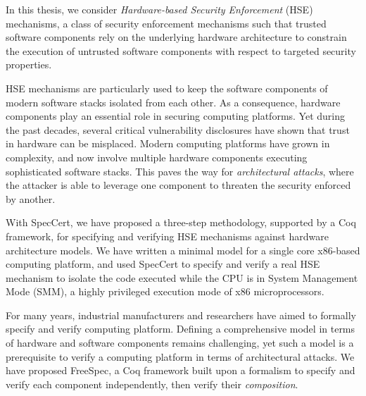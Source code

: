 In this thesis, we consider \emph{Hardware-based Security Enforcement} (HSE)
mechanisms, a class of security enforcement mechanisms such that trusted
software components rely on the underlying hardware architecture to constrain
the execution of untrusted software components with respect to targeted
security properties.

HSE mechanisms are particularly used to keep the software components of modern
software stacks isolated from each other.
%
As a consequence, hardware components play an essential role in securing
computing platforms.
%
Yet during the past decades, several critical vulnerability disclosures have
shown that trust in hardware can be misplaced.
%
Modern computing platforms have grown in complexity, and now involve multiple
hardware components executing sophisticated software stacks.
%
This paves the way for \emph{architectural attacks}, where the attacker is
able to leverage one component to threaten the security enforced by another.

With SpecCert, we have proposed a three-step methodology, supported by a Coq
framework, for specifying and verifying HSE mechanisms against hardware
architecture models.
%
We have written a minimal model for a single core x86-based computing platform,
and used SpecCert to specify and verify a real HSE mechanism to isolate the
code executed while the CPU is in System Management Mode (SMM), a highly
privileged execution mode of x86 microprocessors.

For many years, industrial manufacturers and researchers have aimed to
formally specify and verify computing platform.
%
Defining a comprehensive model in terms of hardware and software components
remains challenging, yet such a model is a prerequisite to verify a computing
platform in terms of architectural attacks.
%
We have proposed FreeSpec, a Coq framework built upon a formalism to specify and verify each component independently, then verify their
\emph{composition}.
